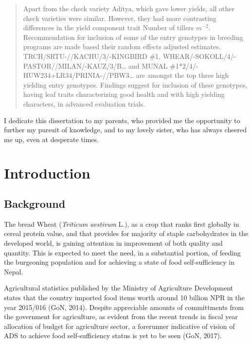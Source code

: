 \documentclass[12pt,oneside]{dukestatscithesis} %
\theoremstyle{definition}
\theoremstyle{definition}
\theoremstyle{definition}
\theoremstyle{remark}
\begin{document}
\begin{abstract}
    Apart from the check variety Aditya, which gave lower yields, all other
    check varieties were similar. However, they had more contrasting
    differences in the yield component trait Number of tillers \(m^{-2}\).
    Recommendation for inclusion of some of the entry genotypes in breeding
    programs are made based their random effects adjusted estimates.
    TRCH/SRTU-//KACHU/3/-KINGBIRD \#1,
    WHEAR/-SOKOLL/4/-PASTOR//MILAN/-KAUZ/3/B\ldots{} and MUNAL
    \#1*2/4/-HUW234+LR34/PRINIA-//PBW3\ldots{} are amongst the top three
    high yielding entry genotypes. Findings suggest for inclusion of these
    genotypes, having leaf traits characterizing good health and with high
    yielding characters, in advanced evaluation trials.
  \end{abstract}
  \begin{dedication}
    \setlength{\baselineskip}{1.5\baselineskip} I dedicate this dissertation
    to my parents, who provided me the opportunity to further my pursuit of
    knowledge, and to my lovely sister, who has always cheered me up, even
    at desperate times.
  \end{dedication}
\mainmatter %
\pagestyle{fancyplain} %

\chapter{Introduction}\label{introduction}

\section{Background}\label{background}

The bread Wheat (\emph{Triticum aestivum} L.), as a crop that ranks
first globally in cereal protein value, and that provides for majority
of staple carbohydrates in the developed world, is gaining attention in
improvement of both quality and quantity. This is expected to meet the
need, in a substantial portion, of feeding the burgeoning population and
for achieving a state of food self-sufficiency in Nepal.

Agricultural statistics published by the Ministry of Agriculture
Development states that the country imported food items worth around 10
billion NPR in the year 2015/016 (GoN, 2014). Despite appreciable
amounts of committments from the government for agriculture, as evident
from the recent trends in fiscal year allocation of budget for
agriculture sector, a forerunner indicative of vision of ADS to achieve
food self-sufficiency status is yet to be seen (GoN, 2017).
\end{document}
